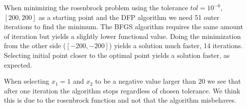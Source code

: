 When minimizing the rosenbrock problem using the tolerance $tol=10^{-6}$, $[200,200]$ as a starting point and the DFP algorithm we need 51 outer iterations to find the minimum. The BFGS algorithm requires the same amount of iteration but yields a slightly lower functional value. Doing the minimization from the other side ($[-200,-200]$) yields a solution much faster, 14 iterations. Selecting initial point closer to the optimal point yields a solution faster, as expected. 

When selecting $x_1=1$ and $x_2$ to be a negative value larger than 20 we see that after one iteration the algorithm stops regardless of chosen tolerance. We think this is due to the rosenbrock function and not that the algorithm misbehaves.
